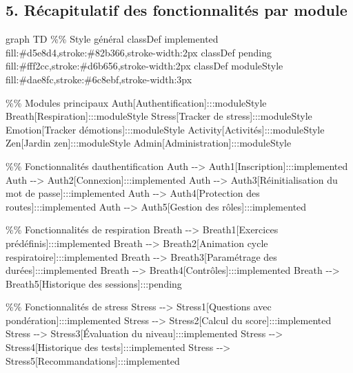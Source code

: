 \documentclass[
]{article}
\newenvironment{Shaded}{}{}
\newcommand{\NormalTok}[1]{#1}
\begin{document}
\subsection{5. Récapitulatif des fonctionnalités par
module}\label{ruxe9capitulatif-des-fonctionnalituxe9s-par-module}

\begin{Shaded}
\begin{Highlighting}[]
\NormalTok{graph TD}
\NormalTok{    \%\% Style général}
\NormalTok{    classDef implemented fill:\#d5e8d4,stroke:\#82b366,stroke{-}width:2px}
\NormalTok{    classDef pending fill:\#fff2cc,stroke:\#d6b656,stroke{-}width:2px}
\NormalTok{    classDef moduleStyle fill:\#dae8fc,stroke:\#6c8ebf,stroke{-}width:3px}
    
\NormalTok{    \%\% Modules principaux}
\NormalTok{    Auth[Authentification]:::moduleStyle}
\NormalTok{    Breath[Respiration]:::moduleStyle}
\NormalTok{    Stress[Tracker de stress]:::moduleStyle}
\NormalTok{    Emotion[Tracker d\textquotesingle{}émotions]:::moduleStyle}
\NormalTok{    Activity[Activités]:::moduleStyle}
\NormalTok{    Zen[Jardin zen]:::moduleStyle}
\NormalTok{    Admin[Administration]:::moduleStyle}
    
\NormalTok{    \%\% Fonctionnalités d\textquotesingle{}authentification}
\NormalTok{    Auth {-}{-}\textgreater{} Auth1[Inscription]:::implemented}
\NormalTok{    Auth {-}{-}\textgreater{} Auth2[Connexion]:::implemented}
\NormalTok{    Auth {-}{-}\textgreater{} Auth3[Réinitialisation du mot de passe]:::implemented}
\NormalTok{    Auth {-}{-}\textgreater{} Auth4[Protection des routes]:::implemented}
\NormalTok{    Auth {-}{-}\textgreater{} Auth5[Gestion des rôles]:::implemented}
    
\NormalTok{    \%\% Fonctionnalités de respiration}
\NormalTok{    Breath {-}{-}\textgreater{} Breath1[Exercices prédéfinis]:::implemented}
\NormalTok{    Breath {-}{-}\textgreater{} Breath2[Animation cycle respiratoire]:::implemented}
\NormalTok{    Breath {-}{-}\textgreater{} Breath3[Paramétrage des durées]:::implemented}
\NormalTok{    Breath {-}{-}\textgreater{} Breath4[Contrôles]:::implemented}
\NormalTok{    Breath {-}{-}\textgreater{} Breath5[Historique des sessions]:::pending}
    
\NormalTok{    \%\% Fonctionnalités de stress}
\NormalTok{    Stress {-}{-}\textgreater{} Stress1[Questions avec pondération]:::implemented}
\NormalTok{    Stress {-}{-}\textgreater{} Stress2[Calcul du score]:::implemented}
\NormalTok{    Stress {-}{-}\textgreater{} Stress3[Évaluation du niveau]:::implemented}
\NormalTok{    Stress {-}{-}\textgreater{} Stress4[Historique des tests]:::implemented}
\NormalTok{    Stress {-}{-}\textgreater{} Stress5[Recommandations]:::implemented}
    

\end{Highlighting}
\end{Shaded}
\end{document}
